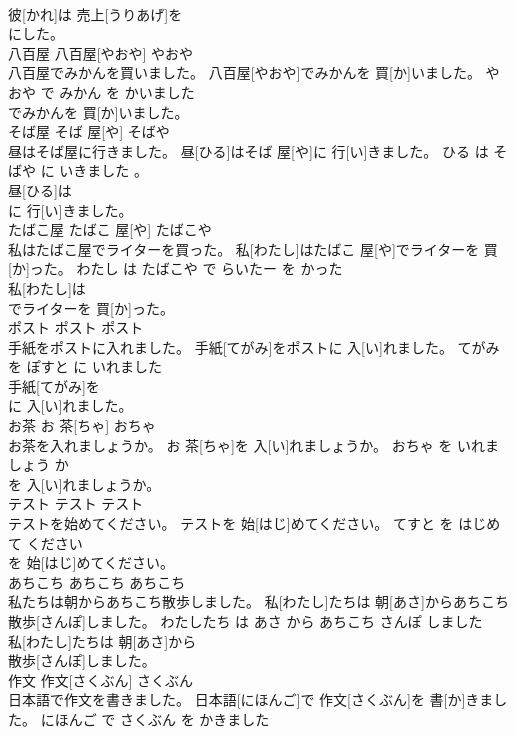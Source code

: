 \documentclass[8pt]{extreport}
\begin{document}
\begin{CJK}{UTF8}{min}
\\	彼[かれ]は 売上[うりあげ]を
\\	にした。			
\\	八百屋	八百屋[やおや]	やおや	
\\	八百屋でみかんを買いました。	八百屋[やおや]でみかんを 買[か]いました。	やおや で みかん を かいました	
\\	でみかんを 買[か]いました。			
\\	そば屋	そば 屋[や]	そばや	
\\	昼はそば屋に行きました。	昼[ひる]はそば 屋[や]に 行[い]きました。	ひる は そばや に いきました 。	
\\	昼[ひる]は
\\	に 行[い]きました。			
\\	たばこ屋	たばこ 屋[や]	たばこや	
\\	私はたばこ屋でライターを買った。	私[わたし]はたばこ 屋[や]でライターを 買[か]った。	わたし は たばこや で らいたー を かった	
\\	私[わたし]は
\\	でライターを 買[か]った。			
\\	ポスト	ポスト	ポスト	
\\	手紙をポストに入れました。	手紙[てがみ]をポストに 入[い]れました。	てがみ を ぽすと に いれました	
\\	手紙[てがみ]を
\\	に 入[い]れました。			
\\	お茶	お 茶[ちゃ]	おちゃ	
\\	お茶を入れましょうか。	お 茶[ちゃ]を 入[い]れましょうか。	おちゃ を いれましょう か	
\\	を 入[い]れましょうか。			
\\	テスト	テスト	テスト	
\\	テストを始めてください。	テストを 始[はじ]めてください。	てすと を はじめて ください	
\\	を 始[はじ]めてください。			
\\	あちこち	あちこち	あちこち	
\\	私たちは朝からあちこち散歩しました。	私[わたし]たちは 朝[あさ]からあちこち 散歩[さんぽ]しました。	わたしたち は あさ から あちこち さんぽ しました	
\\	私[わたし]たちは 朝[あさ]から
\\	散歩[さんぽ]しました。			
\\	作文	作文[さくぶん]	さくぶん	
\\	日本語で作文を書きました。	日本語[にほんご]で 作文[さくぶん]を 書[か]きました。	にほんご で さくぶん を かきました	

\end{CJK}
\end{document}
